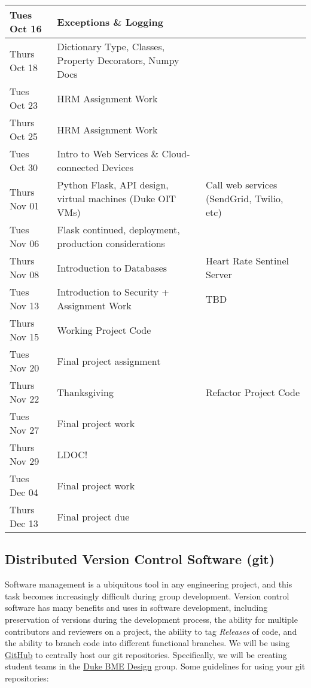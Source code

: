 \begin{longtable}[c]{|l|p{}|p{}|}
  Tues Oct 16 & Exceptions \& Logging & \\ \hline
  
  Thurs Oct 18 & Dictionary Type, Classes, Property Decorators, Numpy Docs & \\ \hline
  
  Tues Oct 23 & HRM Assignment Work & \\ \hline
  
  Thurs Oct 25 & HRM Assignment Work & \\ \hline
  
  Tues Oct 30 & Intro to Web Services \& Cloud-connected Devices & \\ \hline
  
  Thurs Nov 01 & Python Flask, API design, virtual machines (Duke OIT VMs) & 
  Call web services (SendGrid, Twilio, etc) \\ \hline
  
  Tues Nov 06 & Flask continued, deployment, production considerations & \\ \hline
  Thurs Nov 08 & Introduction to Databases & Heart Rate Sentinel Server \\ \hline
  Tues Nov 13 & Introduction to Security + Assignment Work & TBD \\ \hline
  Thurs Nov 15 & Working Project Code & \\ \hline
  Tues Nov 20 & Final project assignment & \\ \hline
  Thurs Nov 22 & Thanksgiving & Refactor Project Code \\ \hline
  Tues Nov 27 & Final project work \\ \hline
  Thurs Nov 29 & LDOC! \\ \hline
  Tues Dec 04 & Final project work & \\ \hline
  Thurs Dec 13 & Final project due & \\ 

  \hline

\end{longtable}


\subsection*{Distributed Version Control Software (git)}
Software management is a ubiquitous tool in any engineering project, and this
task becomes increasingly difficult during group development. Version control
software has many benefits and uses in software development, including
preservation of versions during the development process, the ability for
multiple contributors and reviewers on a project, the ability to tag
\emph{Releases} of code, and the ability to branch code into different
functional branches. We will be using \href{https://github.com}{GitHub} to
centrally host our git repositories. Specifically, we will be creating
student teams in the \href{https://github.com/Duke-BME-Design}{Duke BME
Design} group. Some guidelines for using your git repositories:


